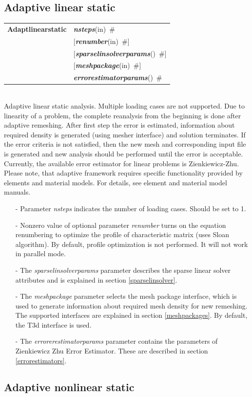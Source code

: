 \documentclass[a4paper]{article}
\makeatletter
\newcommand{\param}[1]{{\em #1}}
\newcommand{\keywordnotype}[1]{\mbox{{\it{\bf{#1}}}}}
\newcommand{\keyword}[2]{\mbox{{\keywordnotype{#1}\tiny (#2)}}}
\newcommand{\entKeywordInst}[1]{\mbox{{\bf{{#1}}}}}
\newcommand{\field}[2]{\mbox{\keyword{#1}{#2}~\#}}
\newcommand{\optField}[2]{\mbox{[\field{#1}{#2}]}}
\newenvironment{record}[1][]{\begin{tabular}{|ll}}{\end{tabular}\\}
\newcommand{\recentry}[2]{{#1}&{#2}\\}
\newcounter{rcc}
\newenvironment{record}[1][\textwidth]{\setcounter{rcc}{0}\begin{tabular*}{#1}{|ll@{\extracolsep{\fill}}r}}{\end{tabular*}\\}
\newcommand{\recentry}[2]{\ifthenelse{\value{rcc}>0}{&$\backslash$ \\}{\setcounter{rcc}{1}}{#1}&{#2}}
\makeatother
\begin{document}
\subsection{Adaptive linear static}
\label{AdaptiveLinearStatic}
\begin{record}
\recentry{\entKeywordInst{Adaptlinearstatic}}{\field{nsteps}{in}}
\recentry{}{\optField{renumber}{in}}
\recentry{}{\optField{sparselinsolverparams}{}} \recentry{}{\optField{meshpackage}{in}}
\recentry{}{\field{errorestimatorparams}{}}
\end{record}
Adaptive linear static analysis. Multiple loading cases are not
supported. Due to linearity of a problem, the complete reanalysis from
the beginning is done after adaptive remeshing.
After first step the error is estimated, information about required density is generated
(using mesher interface) and solution terminates. If the error
criteria is not satisfied, then the new mesh
and corresponding input file is generated and new analysis should be
performed until the error is acceptable.
Currently, the available error estimator for linear problems is
Zienkiewicz-Zhu. Please note, that adaptive framework requires
specific functionality provided by elements and material models. For
details, see element and material model manuals.
\begin{itemize}
\item[-]
Parameter \param{nsteps} indicates the number of loading cases.
Should be set to 1.
\item[-]
Nonzero value of optional parameter \param{renumber} turns on the
equation renumbering to optimize the profile of characteristic matrix
(uses Sloan algorithm). By default, profile optimization is not
performed. It will not work in parallel mode.
\item[-]
The  \param{sparselinsolverparams} parameter describes the sparse
linear solver attributes and is explained in section \ref{sparselinsolver}.
\item[-]
The \param{meshpackage} parameter selects the mesh package interface,
which is used to generate information about required mesh density for
new remeshing. The supported interfaces are explained in section
\ref{meshpackages}. By default, the T3d interface is used.
\item[-]
The \param{errorerestimatorparams} parameter contains the parameters
of Zien\-kie\-wicz Zhu Error Estimator. These are described in section \ref{errorestimators}.
\end{itemize}

\subsection{Adaptive nonlinear static}
\end{document}

